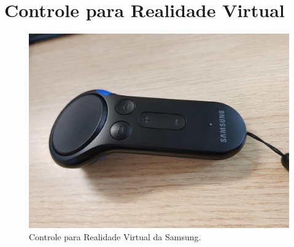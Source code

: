 \documentclass[conference]{IEEEtran}
\begin{document}

\section{Controle para Realidade Virtual} \label{sec:vrcontroller}

\begin{figure}[ht]
\centering
\includegraphics[width=.6\textwidth]{images/gear_controller.jpg}
\caption{Controle para Realidade Virtual da Samsung.}
\label{fig:vrcontroller}
\end{figure}
\end{document}
